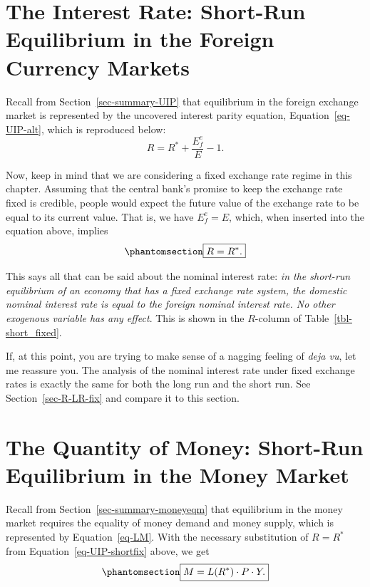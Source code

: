 \documentclass[
  letterpaper,
]{book}
\theoremstyle{plain}
\theoremstyle{remark}
\begin{document}
\section{The Interest Rate: Short-Run Equilibrium in the Foreign
Currency Markets}\label{sec-asseteqm-shortfix}

Recall from Section~\ref{sec-summary-UIP} that equilibrium in the
foreign exchange market is represented by the uncovered interest parity
equation, Equation~\ref{eq-UIP-alt}, which is reproduced below: \[
R=R^*+\frac{E^e_f}{E}-1.
\]

Now, keep in mind that we are considering a fixed exchange rate regime
in this chapter. Assuming that the central bank's promise to keep the
exchange rate fixed is credible, people would expect the future value of
the exchange rate to be equal to its current value. That is, we have
\(E^e_f=E\), which, when inserted into the equation above, implies
\begin{equation}\phantomsection\label{eq-UIP-shortfix}{
\fbox{$\displaystyle R=R^*.$}
}\end{equation}

This says all that can be said about the nominal interest rate: \emph{in
the short-run equilibrium of an economy that has a fixed exchange rate
system, the domestic nominal interest rate is equal to the foreign
nominal interest rate. No other exogenous variable has any effect}. This
is shown in the \(R\)-column of Table~\ref{tbl-short_fixed}.

If, at this point, you are trying to make sense of a nagging feeling of
\emph{deja vu}, let me reassure you. The analysis of the nominal
interest rate under fixed exchange rates is exactly the same for both
the long run and the short run. See Section~\ref{sec-R-LR-fix} and
compare it to this section.

\section{The Quantity of Money: Short-Run Equilibrium in the Money
Market}\label{sec-moneyeqm-shortfix}

Recall from Section~\ref{sec-summary-moneyeqm} that equilibrium in the
money market requires the equality of money demand and money supply,
which is represented by Equation~\ref{eq-LM}. With the necessary
substitution of \(R=R^*\) from Equation~\ref{eq-UIP-shortfix} above, we
get \begin{equation}\phantomsection\label{eq-LM-shortfix}{
\fbox{$\displaystyle M=L(R^*)\cdot P\cdot Y.$}
}\end{equation}
\end{document}
